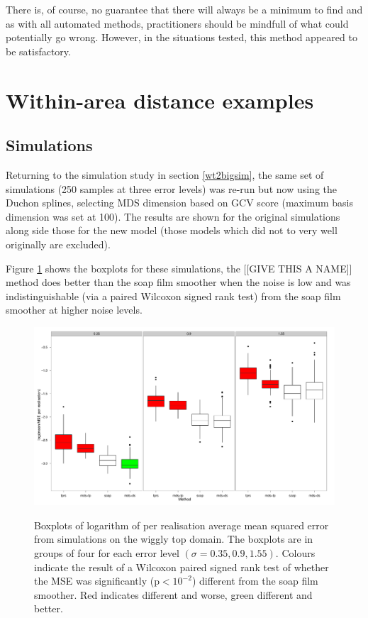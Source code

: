 There is, of course, no guarantee that there will always be a minimum to find and as with all automated methods, practitioners should be mindfull of what could potentially go wrong. However, in the situations tested, this method appeared to be satisfactory.

\section{Within-area distance examples}
\label{gds-wad-examples}
\subsection{Simulations}

Returning to the simulation study in section \ref{wt2bigsim}, the same set of simulations (250 samples at three error levels) was re-run but now using the Duchon splines, selecting MDS dimension based on GCV score (maximum basis dimension was set at 100). The results are shown for the original simulations along side those for the new model (those models which did not to very well originally are excluded).

Figure \ref{wt2-boxplot-duchon} shows the boxplots for these simulations, the [[GIVE THIS A NAME]] method does better than the soap film smoother when the noise is low and was indistinguishable (via a paired Wilcoxon signed rank test) from the soap film smoother at higher noise levels.

\begin{figure}
\centering
\includegraphics[width=6in]{mds/figs/wt2-boxplot-duchon.pdf} \\
\caption{Boxplots of logarithm of per realisation average mean squared error from simulations on the wiggly top domain. The boxplots are in groups of four for each error level $(\sigma = 0.35, 0.9, 1.55)$. Colours indicate the result of a Wilcoxon paired signed rank test of whether the MSE was significantly (p$<10^{-2}$) different from the soap film smoother. Red indicates different and worse, green different and better.}
\label{wt2-boxplot-duchon}
\end{figure}

